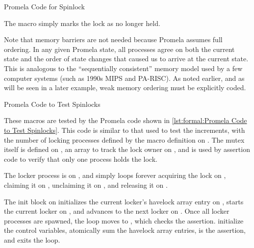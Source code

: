 \begin{listing}

\caption{Promela Code for Spinlock}
\label{lst:formal:Promela Code for Spinlock}
\end{listing}

The  macro simply marks the lock as no
longer held.

Note that memory barriers are not needed because Promela assumes
full ordering.
In any given Promela state, all processes agree on both the current
state and the order of state changes that caused us to arrive at
the current state.
This is analogous to the ``sequentially consistent'' memory model
used by a few computer systems (such as 1990s MIPS and PA-RISC).
As noted earlier, and as will be seen in a later example,
weak memory ordering must be explicitly coded.

\begin{listing}

\caption{Promela Code to Test Spinlocks}
\label{lst:formal:Promela Code to Test Spinlocks}
\end{listing}

\begin{fcvref}
These macros are tested by the Promela code shown in
\cref{lst:formal:Promela Code to Test Spinlocks}.
This code is similar to that used to test the increments,
with the number of locking processes defined by the 
macro definition on .
The mutex itself is defined on ,
an array to track the lock owner
on , and  is used by assertion
code to verify that only one process holds the lock.
\end{fcvref}

\begin{fcvref}
The locker process is on , and simply loops forever
acquiring the lock on , claiming it on ,
unclaiming it on , and releasing it on .
\end{fcvref}

\begin{fcvref}
The init block on  initializes the current locker's
havelock array entry on , starts the current locker on
, and advances to the next locker on .
Once all locker processes are spawned, the  loop
moves to , which checks the assertion.
 initialize the control variables,
 atomically sum the havelock array entries,
 is the assertion, and  exits the loop.
\end{fcvref}


